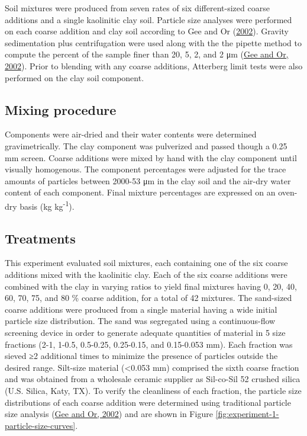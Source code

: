 \documentclass[
  letterpaper,
]{article}
\begin{document}
Soil mixtures were produced from seven rates of six different-sized coarse additions and a single kaolinitic clay soil.
Particle size analyses were performed on each coarse addition and clay soil according to Gee and Or (\protect\hyperlink{ref-Gee2002}{2002}).
Gravity sedimentation plus centrifugation were used along with the the pipette method to compute the percent of the sample finer than 20, 5, 2, and 2 μm (\protect\hyperlink{ref-Gee2002}{Gee and Or, 2002}).
Prior to blending with any coarse additions, Atterberg limit tests were also performed on the clay soil component.

\hypertarget{mixing-procedure}{%
\subsection{Mixing procedure}\label{mixing-procedure}}

Components were air-dried and their water contents were determined gravimetrically.
The clay component was pulverized and passed though a 0.25 mm screen.
Coarse additions were mixed by hand with the clay component until visually homogenous.
The component percentages were adjusted for the trace amounts of particles between 2000-53 μm in the clay soil and the air-dry water content of each component.
Final mixture percentages are expressed on an oven-dry basis (kg kg\textsuperscript{-1}).

\hypertarget{treatments}{%
\subsection{Treatments}\label{treatments}}

This experiment evaluated soil mixtures, each containing one of the six coarse additions mixed with the kaolinitic clay.
Each of the six coarse additions were combined with the clay in varying ratios to yield final mixtures having 0, 20, 40, 60, 70, 75, and 80 \% coarse addition, for a total of 42 mixtures.
The sand-sized coarse additions were produced from a single material having a wide initial particle size distribution. The sand was segregated using a continuous-flow screening device in order to generate adequate quantities of material in 5 size fractions (2-1, 1-0.5, 0.5-0.25, 0.25-0.15, and 0.15-0.053 mm).
Each fraction was sieved ≥2 additional times to minimize the presence of particles outside the desired range.
Silt-size material (\textless0.053 mm) comprised the sixth coarse fraction and was obtained from a wholesale ceramic supplier as Sil-co-Sil 52 crushed silica (U.S. Silica, Katy, TX).
To verify the cleanliness of each fraction, the particle size distributions of each coarse addition were determined using traditional particle size analysis (\protect\hyperlink{ref-Gee2002}{Gee and Or, 2002}) and are shown in Figure \ref{fig:experiment-1-particle-size-curves}.
\end{document}
